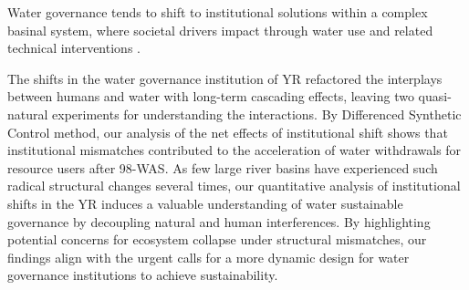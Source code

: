 Water governance tends to shift to institutional solutions within a complex basinal system, where societal drivers impact through water use and related technical interventions \cite{fischer2020}.

The shifts in the water governance institution of YR refactored the interplays between humans and water with long-term cascading effects, leaving two quasi-natural experiments for understanding the interactions.
By Differenced Synthetic Control method, our analysis of the net effects of institutional shift shows that institutional mismatches contributed to the acceleration of water withdrawals for resource users after 98-WAS.
As few large river basins have experienced such radical structural changes several times, our quantitative analysis of institutional shifts in the YR induces a valuable understanding of water sustainable governance by decoupling natural and human interferences.
By highlighting potential concerns for ecosystem collapse under structural mismatches, our findings align with the urgent calls for a more dynamic design for water governance institutions to achieve sustainability.
